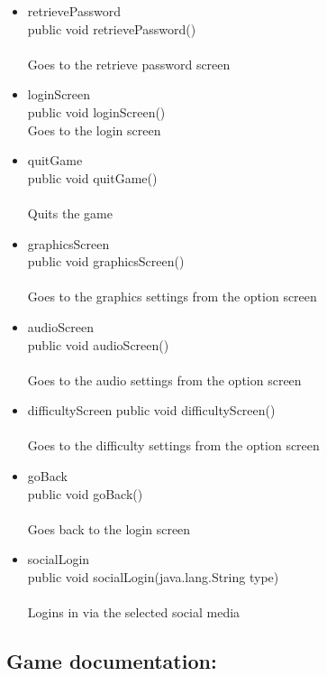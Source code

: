 \documentclass[letterpaper]{article}
\begin{document}
\begin{itemize}
\begin{itemize}
								\item	retrievePassword \\
										public void retrievePassword() \\ \\
										Goes to the retrieve password screen
								\item	loginScreen \\
										public void loginScreen() \\
										Goes to the login screen
								\item	quitGame \\
										public void quitGame() \\ \\
										Quits the game
								\item	graphicsScreen \\
										public void graphicsScreen() \\ \\
										Goes to the graphics settings from the option screen
								\item	audioScreen \\
										public void audioScreen() \\ \\
										Goes to the audio settings from the option screen
								\item	difficultyScreen
										public void difficultyScreen() \\ \\
										Goes to the difficulty settings from the option screen
								\item	goBack \\
										public void goBack() \\ \\
										Goes back to the login screen
								\item	socialLogin \\
										public void socialLogin(java.lang.String type) \\ \\
										Logins in via the selected social media
							\end{itemize}
				\end{itemize}
				
			\vspace{0.2in}
			\subsection*{Game documentation:}
			\vspace{0.1in}
			
\end{document}
